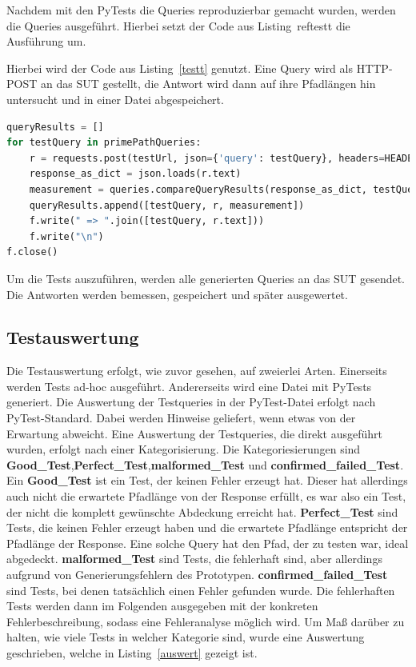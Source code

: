 Nachdem mit den PyTests die Queries reproduzierbar gemacht wurden, werden die Queries ausgeführt.
Hierbei setzt der Code aus Listing~ref{testt} die Ausführung um.


Hierbei wird der Code aus Listing~\ref{testt} genutzt.
Eine Query wird als HTTP-POST an das SUT gestellt, die Antwort wird dann auf ihre Pfadlängen hin untersucht und in
einer Datei abgespeichert.

\begin{lstlisting}[language=Python, caption={Ausführen einer Testquery}, label={testt}]
queryResults = []
for testQuery in primePathQueries:
    r = requests.post(testUrl, json={'query': testQuery}, headers=HEADERS)
    response_as_dict = json.loads(r.text)
    measurement = queries.compareQueryResults(response_as_dict, testQuery)
    queryResults.append([testQuery, r, measurement])
    f.write(" => ".join([testQuery, r.text]))
    f.write("\n")
f.close()
\end{lstlisting}

Um die Tests auszuführen, werden alle generierten Queries an das SUT gesendet.
Die Antworten werden bemessen, gespeichert und später ausgewertet.

\subsection{Testauswertung}

Die Testauswertung erfolgt, wie zuvor gesehen, auf zweierlei Arten.
Einerseits werden Tests ad-hoc ausgeführt.
Andererseits wird eine Datei mit PyTests generiert.
Die Auswertung der Testqueries in der PyTest-Datei erfolgt nach PyTest-Standard. Dabei werden Hinweise geliefert, wenn etwas von der Erwartung abweicht.
Eine Auswertung der Testqueries, die direkt ausgeführt wurden, erfolgt nach einer Kategorisierung.
Die Kategoriesierungen sind \textbf{Good\_Test},\textbf{Perfect\_Test},\textbf{malformed\_Test} und \textbf{confirmed\_failed\_Test}.
Ein \textbf{Good\_Test} ist ein Test, der keinen Fehler erzeugt hat.
Dieser hat allerdings auch nicht die erwartete Pfadlänge von der Response erfüllt, es war also ein Test,
der nicht die komplett gewünschte Abdeckung erreicht hat.
\textbf{Perfect\_Test} sind Tests, die keinen Fehler erzeugt haben und die erwartete Pfadlänge entspricht der Pfadlänge der Response.
Eine solche Query hat den Pfad, der zu testen war, ideal abgedeckt.
\textbf{malformed\_Test} sind Tests, die fehlerhaft sind, aber allerdings aufgrund von Generierungsfehlern des Prototypen.
\textbf{confirmed\_failed\_Test} sind Tests, bei denen tatsächlich einen Fehler gefunden wurde.
Die fehlerhaften Tests werden dann im Folgenden ausgegeben mit der konkreten Fehlerbeschreibung, sodass eine Fehleranalyse möglich wird.
Um Maß darüber zu halten, wie viele Tests in welcher Kategorie sind, wurde eine Auswertung geschrieben, welche in Listing~\ref{auswert} gezeigt ist.


